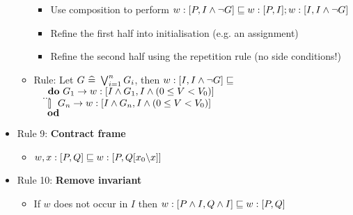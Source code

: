 \begin{itemize}
\begin{itemize}
\begin{itemize}
			\item Use composition to perform $ w : [P, I \land \lnot G] \mathrel{\sqsubseteq} w : [P, I]; w : [I, I \land \lnot G] $
			
			\item Refine the first half into initialisation (e.g. an assignment)
			
			\item Refine the second half using the repetition rule (no side conditions!)
			
		\end{itemize}
	
	\item Rule: Let $ G ~ \widehat{=} ~ \bigvee_{i=1}^{n} G_i $, then $ w : [I, I \land \lnot G] \mathrel{\sqsubseteq}$\\
	$ ~~~~ {\bf do} ~ G_1 \rightarrow w : [I \land G_1, I \land (0 \le V < V_0)] $\\
	$ ~~~~ \dots $\\
	$ ~~~~ \mathrel{\tt [\hspace*{-1pt}]} ~ G_n \rightarrow w : [I \land G_n, I \land (0 \le V < V_0)] $\\
	$ ~~~~ {\bf od} $
	
	\end{itemize}

	\item Rule 9: \textbf{Contract frame}
	
	\begin{itemize}
		
		\item $ w, x : [P, Q] \mathrel{\sqsubseteq} w : [P, Q[x_0 \backslash x]] $
		
	\end{itemize}

	\item Rule 10: \textbf{Remove invariant}
	
	\begin{itemize}
		
		\item If $ w $ does not occur in $ I $ then $ w : [P \land I, Q \land I] \mathrel{\sqsubseteq} w : [P, Q] $
		
	\end{itemize}
	
\end{itemize}